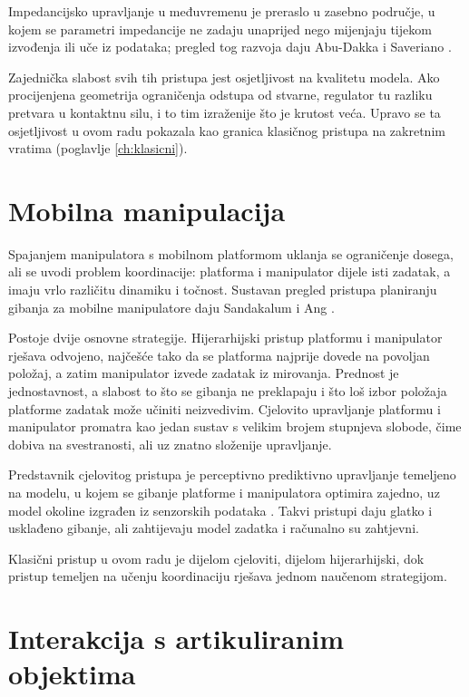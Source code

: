 Impedancijsko upravljanje u međuvremenu je preraslo u zasebno područje, u kojem se parametri
impedancije ne zadaju unaprijed nego mijenjaju tijekom izvođenja ili uče iz podataka; pregled tog
razvoja daju Abu-Dakka i Saveriano \cite{abudakka2020review}.

Zajednička slabost svih tih pristupa jest osjetljivost na kvalitetu modela. Ako procijenjena
geometrija ograničenja odstupa od stvarne, regulator tu razliku pretvara u kontaktnu silu, i to
tim izraženije što je krutost veća. Upravo se ta osjetljivost u ovom radu pokazala kao granica
klasičnog pristupa na zakretnim vratima (poglavlje \ref{ch:klasicni}).

\section{Mobilna manipulacija}
\label{sec:pregled-mobilna}

Spajanjem manipulatora s mobilnom platformom uklanja se ograničenje dosega, ali se uvodi
problem koordinacije: platforma i manipulator dijele isti zadatak, a imaju vrlo različitu
dinamiku i točnost. Sustavan pregled pristupa planiranju gibanja za mobilne manipulatore daju
Sandakalum i Ang \cite{sandakalum2022review}.

Postoje dvije osnovne strategije. Hijerarhijski pristup platformu i manipulator rješava
odvojeno, najčešće tako da se platforma najprije dovede na povoljan položaj, a zatim manipulator
izvede zadatak iz mirovanja. Prednost je jednostavnost, a slabost to što se gibanja ne preklapaju
i što loš izbor položaja platforme zadatak može učiniti neizvedivim. Cjelovito upravljanje
platformu i manipulator promatra kao jedan sustav s velikim brojem stupnjeva slobode, čime dobiva
na svestranosti, ali uz znatno složenije upravljanje.

Predstavnik cjelovitog pristupa je perceptivno prediktivno upravljanje temeljeno na modelu, u
kojem se gibanje platforme i manipulatora optimira zajedno, uz model okoline izgrađen iz
senzorskih podataka \cite{pankert2020perceptive}. Takvi pristupi daju glatko i usklađeno gibanje,
ali zahtijevaju model zadatka i računalno su zahtjevni.

Klasični pristup u ovom radu je dijelom cjeloviti, dijelom hijerarhijski,
dok pristup temeljen na učenju koordinaciju rješava jednom naučenom strategijom.

\section{Interakcija s artikuliranim objektima}
\label{sec:pregled-artikulirani}

